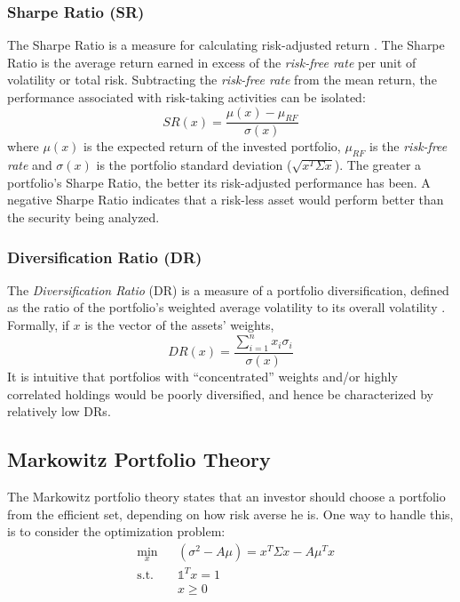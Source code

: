 \subsubsection{Sharpe Ratio (SR)}
The Sharpe Ratio is a measure for calculating risk-adjusted return \cite{sharpe}. The Sharpe Ratio is the average return earned in excess of the \textit{risk-free rate} per unit of volatility or total risk. Subtracting the \textit{risk-free rate} from the mean return, the performance associated with risk-taking activities can be isolated:
\begin{equation}\label{eq:SR}
SR(x) = \frac{\mu(x) - \mu_{RF}}{\sigma(x)}
\end{equation} 
where $\mu(x)$ is the expected return of the invested portfolio, $\mu_{RF}$ is the \textit{risk-free rate} and $\sigma(x)$ is the portfolio standard deviation ($\sqrt{x^T \Sigma x}$). The greater a portfolio's Sharpe Ratio, the better its risk-adjusted performance has been. A negative Sharpe Ratio indicates that a risk-less asset would perform better than the security being analyzed.

\subsubsection{Diversification Ratio (DR)}
The \textit{Diversification Ratio} (DR) is a measure of a portfolio diversification, defined as the ratio of the portfolio’s weighted
average volatility to its overall volatility \cite{diversification}. Formally, if $x$ is the vector of the assets' weights,
\begin{equation}\label{eq:dr}
DR(x) = \frac{\sum_{i=1}^{n}x_i\sigma_i}{\sigma(x)}
\end{equation}
It is intuitive that portfolios with “concentrated” weights and/or highly correlated holdings would be poorly diversified, and hence be characterized by relatively low DRs.

\subsection{Markowitz Portfolio Theory}
The Markowitz portfolio theory states that an investor should
choose a portfolio from the efficient set, depending on how risk averse he is. One way to handle this, is to consider the optimization problem\footnotemark[1]:
\begin{equation}
\begin{aligned}
&\min_x &&(\sigma^2 - A\mu) = x^T \Sigma x - A\mu^T x\\
&\text{s.t.}&&\mathds{1}^T x=1\\
&&&x \geq 0
\end{aligned}
\end{equation}

